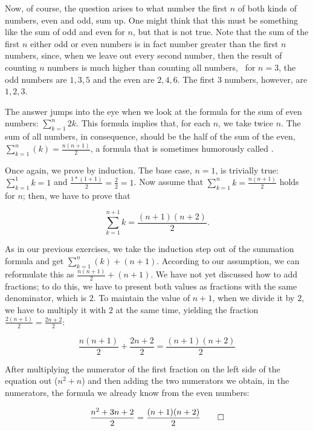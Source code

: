 \documentclass{scrreprt}
\begin{document}
Now, of course, the question arises
to what number the first $n$ of both kinds of numbers, 
even and odd, sum up.
One might think that this must be something
like the sum of odd and even for $n$,
but that is not true.
Note that the sum of the first $n$ 
either odd or even numbers 
is in fact number greater than the first $n$ numbers,
since, when we leave out every second number,
then the result of counting $n$ numbers is much higher
than counting all numbers, \eg\
for $n = 3$, the odd numbers are $1, 3, 5$ and
             the even are $2, 4, 6$.
The first 3 numbers, however, are $1, 2, 3$. 

The answer jumps into the eye
when we look at the formula for the sum of even numbers:
$\sum_{k=1}^{n}2k$. This formula implies 
that, for each $n$, we take twice $n$.
The sum of all numbers, in consequence, 
should be the half of the sum of the even, \ie\ 
$\sum_{k=1}^{n}{(k)} = \frac{n(n+1)}{2}$,
a formula that is sometimes humorously called
\term{The Little Gauss}.

Once again, we prove by induction.
The base case, $n=1$, is trivially true:
$\sum_{k=1}^{1}{k} = 1$ and
$\frac{1 * (1 + 1)}{2} = \frac{2}{2} = 1$.
Now assume that 
$\sum_{k=1}^{n}{k} = \frac{n(n+1)}{2}$
holds for $n$;
then, we have to prove that

\begin{equation}
\sum_{k=1}^{n+1}{k} = \frac{(n+1)(n+2)}{2}.
\end{equation}

As in our previous exercises, 
we take the induction step out of the summation formula
and get $\sum_{k=1}^{n}{(k)} + (n + 1)$. 
According to our assumption, we can reformulate this as
$\frac{n(n+1)}{2} + (n + 1)$.
We have not yet discussed how to add fractions;
to do this, we have to present both values
as fractions with the same denominator,
which is $2$. 
To maintain the value of $n + 1$, 
when we divide it by $2$,
we have to multiply it with $2$ at the same time,
yielding the fraction $\frac{2(n+1)}{2} = \frac{2n + 2}{2}$:

\begin{equation}
\frac{n(n+1)}{2} + \frac{2n + 2}{2} = \frac{(n+1)(n+2)}{2}
\end{equation}

After multiplying the numerator of the first fraction
on the left side of the equation out 
($n^2 + n$)
and then adding the two numerators we
obtain, in the numerators, the formula
we already know from the even numbers: 

\begin{equation}
\frac{n^2 + 3n + 2}{2} = \frac{(n+1)(n+2)}{2}\qed
\end{equation}
\end{document}
